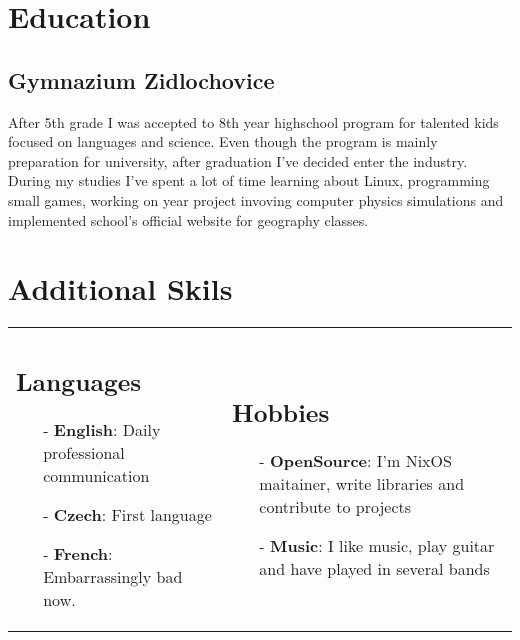 \documentclass[9pt]{article}
\begin{document}
\section{Education}

\subsection{Gymnazium Zidlochovice}

After 5th grade I was accepted to 8th year highschool program for talented kids focused on languages and science.
Even though the program is mainly preparation for university, after graduation I've decided enter
the industry. During my studies I've spent a lot of time learning about Linux, programming small
games, working on year project invoving computer physics simulations and implemented school's
official website for geography classes.

\vspace{0.3cm}
\section{Additional Skils}
\vspace{-0.3cm}

\begin{tabular}{@{}ll}
  \begin{minipage}[t]{0.5\textwidth}
      \subsection{Languages}
      \begin{itemize}[leftmargin=0.3cm]
        \item[-] \textbf{English}: Daily professional communication
        \item[-] \textbf{Czech}: First language
        \item[-] \textbf{French}: Embarrassingly bad now.
      \end{itemize}
  \end{minipage}
  & \begin{minipage}[t]{0.5\textwidth}
      \subsection{Hobbies}
      \begin{itemize}[leftmargin=0.3cm]
        \item[-] \textbf{OpenSource}: I'm NixOS maitainer, write libraries and contribute to projects
        \item[-] \textbf{Music}: I like music, play guitar and have played in several bands
      \end{itemize}
  \end{minipage} \\
\end{tabular}
\end{document}
